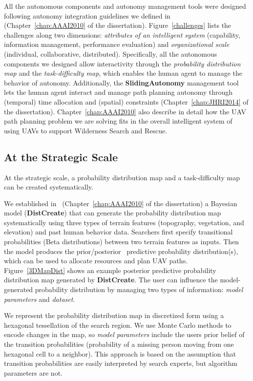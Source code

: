 All the autonomous components and autonomy management tools were designed following autonomy integration guidelines we defined in~\cite{Lin2010Supporting} (Chapter~\ref{chap:AAAI2010} of the dissertation). Figure~\ref{challenges} lists the challenges along two dimensions: \textit{attributes of an intelligent system} (capability, information management, performance evaluation) and \textit{organizational scale} (individual, collaborative, distributed). Specifically, all the autonomous components we designed allow interactivity through the \textit{probability distribution map} and the \textit{task-difficulty map}, which enables the human agent to manage the behavior of autonomy. Additionally, the \textbf{SlidingAutonomy} management tool lets the human agent interact and manage path planning autonomy through (temporal) time allocation and (spatial) constraints (Chapter~\ref{chap:JHRI2014} of the dissertation). Chapter~\ref{chap:AAAI2010} also describe in detail how the UAV path planning problem we are solving fits in the overall intelligent system of using UAVs to support Wilderness Search and Rescue. 

\subsection{At the Strategic Scale}

At the strategic scale, a probability distribution map and a task-difficulty map can be created systematically.

We established in~\cite{Lin2010Bayesian} (Chapter~\ref{chap:AAAI2010} of the dissertation) a Bayesian model (\textbf{DistCreate}) that can generate the probability distribution map systematically using three types of terrain features (topography, vegetation, and elevation) and past human behavior data. Searchers first specify transitional probabilities (Beta distributions) between two terrain features as inputs. Then the model produces the prior/posterior~\cite{Russell2009Artificial} predictive probability distribution(s), which can be used to allocate resources and plan UAV paths. Figure~\ref{3DMapDist} shows an example posterior predictive probability distribution map generated by \textbf{DistCreate}. The user can influence the model-generated probability distribution by managing two types of information: \textit{model parameters} and \textit{dataset}. 

We represent the probability distribution map in discretized form using a hexagonal tessellation of the search region. We use Monte Carlo methods to encode changes in the map, so \textit{model parameters} include the users prior belief of the transition probabilities (probability of a missing person moving from one hexagonal cell to a neighbor). This approach is based on the assumption that transition probabilities are easily interpreted by search experts, but algorithm parameters are not. 

